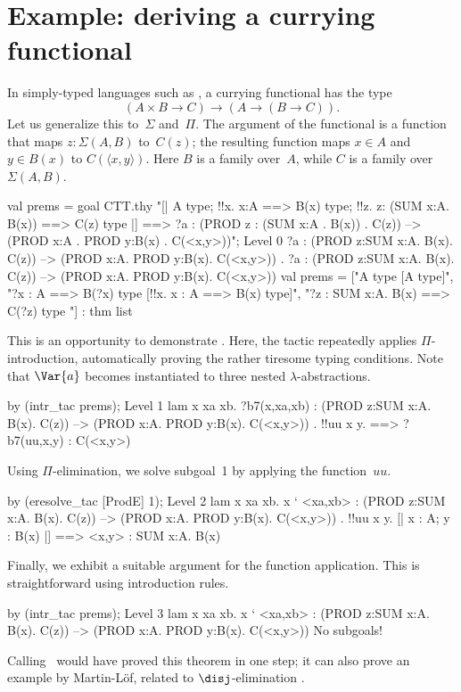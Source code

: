 \section{Example: deriving a currying functional}
In simply-typed languages such as {\ML}, a currying functional has the type 
\[ (A\times B \to C) \to (A\to (B\to C)). \]
Let us generalize this to~$\Sigma$ and~$\Pi$.  The argument of the
functional is a function that maps $z:\Sigma(A,B)$ to~$C(z)$; the resulting
function maps $x\in A$ and $y\in B(x)$ to $C(\langle x,y\rangle)$.  Here
$B$ is a family over~$A$, while $C$ is a family over $\Sigma(A,B)$.
\begin{ttbox}
val prems = goal CTT.thy
    "[| A type; !!x. x:A ==> B(x) type;                    \ttback
\ttback               !!z. z: (SUM x:A. B(x)) ==> C(z) type |]   \ttback
\ttback    ==> ?a : (PROD z : (SUM x:A . B(x)) . C(z))           \ttback
\ttback         --> (PROD x:A . PROD y:B(x) . C(<x,y>))";
{\out Level 0}
{\out ?a : (PROD z:SUM x:A. B(x). C(z)) --> (PROD x:A. PROD y:B(x). C(<x,y>))}
{. ?a : (PROD z:SUM x:A. B(x). C(z)) -->}
{\out          (PROD x:A. PROD y:B(x). C(<x,y>))}
{\out val prems = ["A type  [A type]",}
{\out              "?x : A ==> B(?x) type  [!!x. x : A ==> B(x) type]",}
{\out              "?z : SUM x:A. B(x) ==> C(?z) type}
{\out               [!!z. z : SUM x:A. B(x) ==> C(z) type]"] : thm list}
\end{ttbox}
This is an opportunity to demonstrate .  Here, the tactic
repeatedly applies $\Pi$-introduction, automatically proving the rather
tiresome typing conditions.  Note that $\Var{a}$ becomes instantiated to
three nested $\lambda$-abstractions.
\begin{ttbox}
by (intr_tac prems);
{\out Level 1}
{\out lam x xa xb. ?b7(x,xa,xb)}
{\out : (PROD z:SUM x:A. B(x). C(z)) --> (PROD x:A. PROD y:B(x). C(<x,y>))}
{. !!uu x y.}
{ ==>}
{\out        ?b7(uu,x,y) : C(<x,y>)}
\end{ttbox}
Using $\Pi$-elimination, we solve subgoal~1 by applying the function~$uu$.
\begin{ttbox}
by (eresolve_tac [ProdE] 1);
{\out Level 2}
{\out lam x xa xb. x ` <xa,xb>}
{\out : (PROD z:SUM x:A. B(x). C(z)) --> (PROD x:A. PROD y:B(x). C(<x,y>))}
{. !!uu x y. [| x : A; y : B(x) |] ==> <x,y> : SUM x:A. B(x)}
\end{ttbox}
Finally, we exhibit a suitable argument for the function application.  This
is straightforward using introduction rules.
\begin{ttbox}
by (intr_tac prems);
{\out Level 3}
{\out lam x xa xb. x ` <xa,xb>}
{\out : (PROD z:SUM x:A. B(x). C(z)) --> (PROD x:A. PROD y:B(x). C(<x,y>))}
{\out No subgoals!}
\end{ttbox}
Calling~ would have proved this theorem in one step; it can
also prove an example by Martin-L\"of, related to $\disj$-elimination
\cite[page~58]{martinlof84}.


